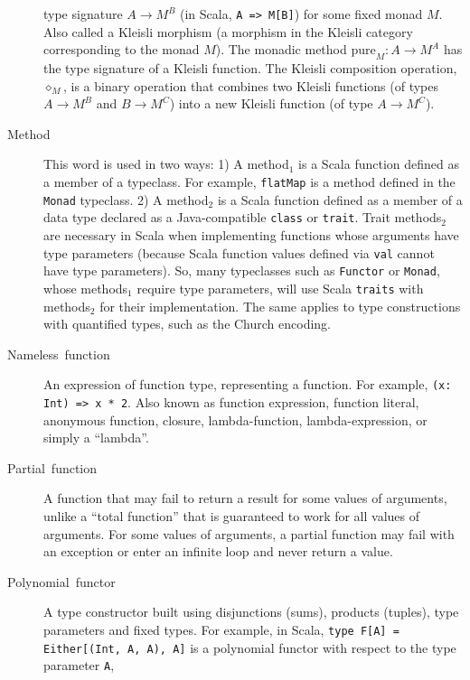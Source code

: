 \begin{description}
type signature $A\rightarrow M^{B}$ (in Scala, \lstinline!A => M[B]!)
for some fixed monad $M$. Also called a Kleisli morphism
(a morphism in the Kleisli category corresponding to the monad $M$).
The monadic method $\text{pure}_{M}:A\rightarrow M^{A}$ has the type
signature of a Kleisli function. The Kleisli composition operation,
$\diamond_{M}$, is a binary operation that combines two Kleisli functions
(of types $A\rightarrow M^{B}$ and $B\rightarrow M^{C}$) into a
new Kleisli function (of type $A\rightarrow M^{C}$).
\item [{\index{method}Method}] This word is used in two ways: 1) A method$_{1}$
is a Scala function defined as a member of a typeclass. For example,
\lstinline!flatMap! is a method defined in the \lstinline!Monad!
typeclass. 2) A method$_{2}$ is a Scala function defined as a member
of a data type declared as a Java-compatible \lstinline!class! or
\lstinline!trait!. Trait methods$_{2}$ are necessary in Scala when
implementing functions whose arguments have type parameters (because
Scala function values defined via \lstinline!val! cannot have type
parameters). So, many typeclasses such as \lstinline!Functor! or
\lstinline!Monad!, whose methods$_{1}$ require type parameters,
will use Scala \lstinline!traits! with methods$_{2}$ for their implementation.
The same applies to type constructions with quantified types, such
as the Church encoding. 
\item [{Nameless~function}] An expression of
function type, representing a function. For example, \lstinline!(x: Int) => x * 2!.
Also known as function expression, function literal, anonymous function,
closure, lambda-function,
lambda-expression, or simply a \textsf{``}lambda\textsf{''}.
\item [{Partial~function}] A function that may fail to return a result
for some values of arguments, unlike a \textsf{``}total function\textsf{''} that is
guaranteed to work for all values of arguments. For some values of
arguments, a partial function may fail with an exception or enter
an infinite loop and never return a value.
\item [{Polynomial~functor}] A type constructor
built using disjunctions (sums), products (tuples), type parameters
and fixed types. For example, in Scala, \lstinline!type F[A] = Either[(Int, A, A), A]!
is a polynomial functor with respect to the type parameter \lstinline!A!,

\end{description}
